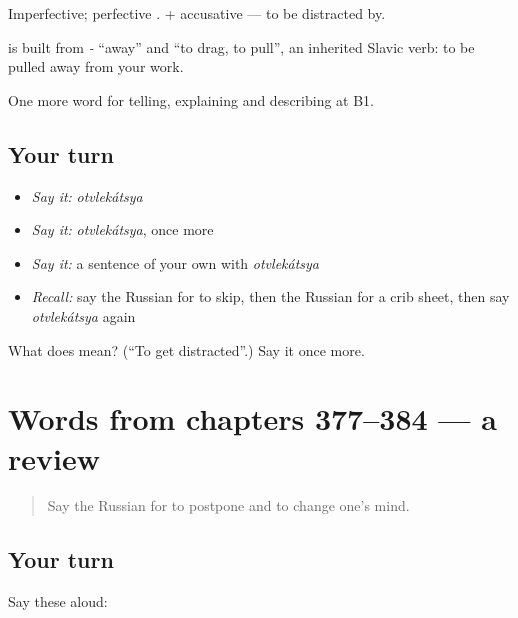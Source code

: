 Imperfective; perfective \emph{}. \emph{ } + accusative — to be distracted by.

\begin{cousinweb}
\textbf{} is built from \emph{-} \textquotedblleft{}away\textquotedblright{} and \emph{} \textquotedblleft{}to drag, to pull\textquotedblright{}, an inherited Slavic verb: to be pulled away from your work.
\end{cousinweb}

\begin{grammarlens}[title={What you've built}]
One more word for telling, explaining and describing at B1.
\end{grammarlens}

\subsection*{Your turn}
\begin{itemize}
\raggedright
  \item \emph{Say it:} \emph{otvlekátsya}
  \item \emph{Say it:} \emph{otvlekátsya}, once more
  \item \emph{Say it:} a sentence of your own with \emph{otvlekátsya}
  \item \emph{Recall:} say the Russian for to skip, then the Russian for a crib sheet, then say \emph{otvlekátsya} again
\end{itemize}

\begin{tcolorbox}[breakable,colback=teal!4,colframe=teal!35!black,title={Before you move on}]
What does  mean? (\textquotedblleft{}To get distracted\textquotedblright{}.) Say it once more.
\end{tcolorbox}
\section[(dialogue)]{Words from chapters 377–384 — a review}

\label{lesson:RU-R384-review-377-384}



\begin{quote}
Say the Russian for to postpone and to change one’s mind.
\end{quote}

\subsection*{Your turn}
Say these aloud:

